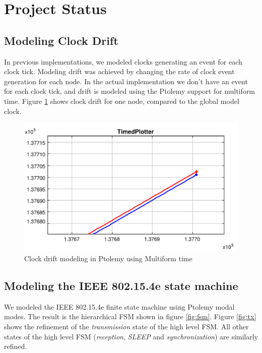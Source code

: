 \section{Project Status}
\label{sec:project-status}

\subsection{Modeling Clock Drift}
\label{sec:modeling-clock-drift}
In previous implementations, we modeled clocks generating an event for each clock tick. Modeling drift was achieved by changing the rate of clock event generation for each node.
In the actual implementation we don't have an event for each clock tick, and drift is modeled using the Ptolemy support for multiform time. Figure \ref{fig:time} shows clock drift for one node, compared to the global model clock.

\begin{figure}
  \centering
  \includegraphics[width=\textwidth]{figures/time-drift.pdf}
  \caption{Clock drift modeling in Ptolemy using Multiform time}
  \label{fig:time}
\end{figure}

\subsection{Modeling the IEEE 802.15.4e state machine}
\label{sec:modeling-state-machine}

We modeled the IEEE 802.15.4e finite state machine using Ptolemy modal modes. The result is the hierarchical FSM shown in figure \ref{fig:fsm}. Figure \ref{fig:tx} shows the refinement of the \emph{transmission} state of the high level FSM. All other states of the high level FSM (\emph{reception}, \emph{SLEEP} and \emph{synchronization}) are similarly refined.

